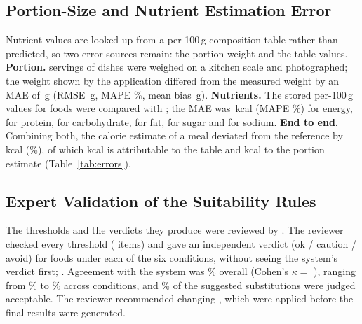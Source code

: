 \subsection{Portion-Size and Nutrient Estimation Error}
Nutrient values are looked up from a per-100\,g composition table rather than predicted, so two
error sources remain: the portion weight and the table values. \textbf{Portion.}  servings of
 dishes were weighed on a kitchen scale and photographed; the weight shown by the application
differed from the measured weight by an MAE of \,g (RMSE \,g, MAPE \%, mean bias
\,g). \textbf{Nutrients.} The stored per-100\,g values for  foods were compared with
; the MAE was \,kcal (MAPE \%) for energy,
 for protein,  for carbohydrate,  for fat,  for sugar and 
for sodium. \textbf{End to end.} Combining both, the calorie estimate of a meal deviated from the
reference by  kcal (\%), of which  kcal is attributable to the
table and  kcal to the portion estimate (Table~\ref{tab:errors}).

\subsection{Expert Validation of the Suitability Rules}
The thresholds and the verdicts they produce were reviewed by . The reviewer checked every threshold ( items) and gave an
independent verdict (ok / caution / avoid) for  foods under each of the six conditions,
without seeing the system's verdict first; .
Agreement with the system was \% overall (Cohen's $\kappa=$ ), ranging from
\% to \% across conditions, and \% of the  suggested substitutions were
judged acceptable. The reviewer recommended changing , which were
applied before the final results were generated. 

